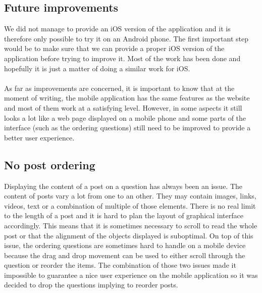 \subsection{Future improvements}
We did not manage to provide an iOS version of the application and it is therefore only possible to try it on an Android phone. The first important step would be to make sure that we can provide a proper iOS version of the application before trying to improve it. Most of the work has been done and hopefully it is just a matter of doing a similar work for iOS.\\\\
As far as improvements are concerned, it is important to know that at the moment of writing, the mobile application has the same features as the website and most of them work at a satisfying level. However, in some aspects it still looks a lot like a web page displayed on a mobile phone and some parts of the interface (such as the ordering questions) still need to be improved to provide a better user experience.


\subsection{No post ordering}\label{subsec:postorder}
Displaying the content of a post on a question has always been an issue. The content of posts vary a lot from one to an other. They may contain images, links, videos, text or a combination of multiple of those elements. There is no real limit to the length of a post and it is hard to plan the layout of graphical interface accordingly. This means that it is sometimes necessary to scroll to read the whole post or that the alignment of the objects displayed is suboptimal. On top of this issue, the ordering questions are sometimes hard to handle on a mobile device because the drag and drop movement can be used to either scroll through the question or reorder the items. The combination of those two issues made it impossible to guarantee a nice user experience on the mobile application so it was decided to drop the questions implying to reorder posts.
